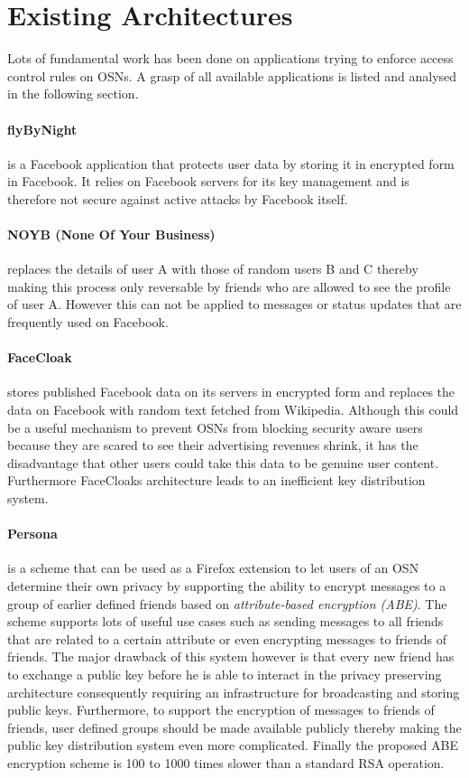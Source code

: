 \documentclass[journal]{IEEEtran}
\begin{document}
\section{Existing Architectures~\cite{BeatoScramble}}
Lots of fundamental work has been done on applications trying to enforce
access control rules on OSNs. A grasp of all available applications is
listed and analysed in the following section.

\paragraph{flyByNight} is a Facebook application that protects user data by
storing it in encrypted form in Facebook. It relies on Facebook servers for its
key management and is therefore not secure against active attacks by Facebook
itself.

\paragraph{NOYB (None Of Your Business)} replaces the details of user A with
those of random users B and C thereby making this process only reversable by
friends who are allowed to see the profile of user A. However this can not be
applied to messages or status updates that are frequently used on Facebook.

\paragraph{FaceCloak} stores published Facebook data on its servers in encrypted
form and replaces the data on Facebook with random text fetched from Wikipedia.
Although this could be a useful mechanism to prevent OSNs from blocking security
aware users because they are scared to see their advertising revenues shrink, it
has the disadvantage that other users could take this data to be genuine user
content. Furthermore FaceCloaks architecture leads to an inefficient key
distribution system.

\paragraph{Persona} is a scheme that can be used as a Firefox extension to let
users of an OSN determine their own privacy by supporting the ability to encrypt
messages to a group of earlier defined friends based on \textit{attribute-based
encryption (ABE)}\cite{SahaiFuzzyIBE}. The scheme supports lots of useful use
cases such as sending messages to all friends that are related to a certain
attribute or even encrypting messages to friends of friends. The major drawback
of this system however is that every new friend has to exchange a public key
before he is able to interact in the privacy preserving architecture
consequently requiring an infrastructure for broadcasting and storing public
keys. Furthermore, to support the encryption of messages to friends of friends,
user defined groups should be made available publicly thereby making the public
key distribution system even more complicated. Finally the proposed ABE
encryption scheme is 100 to 1000 times slower than a standard RSA operation.
\cite{BadenPersona} 
\end{document}
